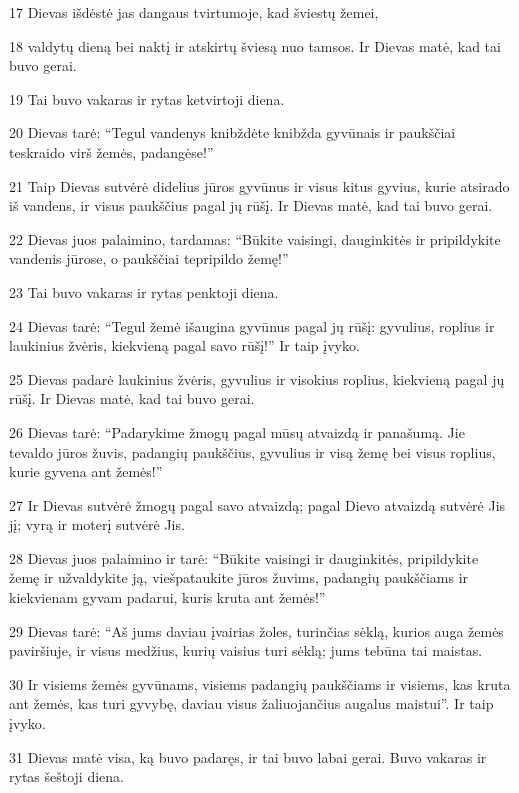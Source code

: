 \par 17 Dievas išdėstė jas dangaus tvirtumoje, kad šviestų žemei, 
\par 18 valdytų dieną bei naktį ir atskirtų šviesą nuo tamsos. Ir Dievas matė, kad tai buvo gerai. 
\par 19 Tai buvo vakaras ir rytas­ ketvirtoji diena. 
\par 20 Dievas tarė: “Tegul vandenys knibždėte knibžda gyvūnais ir paukščiai teskraido virš žemės, padangėse!” 
\par 21 Taip Dievas sutvėrė didelius jūros gyvūnus ir visus kitus gyvius, kurie atsirado iš vandens, ir visus paukščius pagal jų rūšį. Ir Dievas matė, kad tai buvo gerai. 
\par 22 Dievas juos palaimino, tardamas: “Būkite vaisingi, dauginkitės ir pripildykite vandenis jūrose, o paukščiai tepripildo žemę!” 
\par 23 Tai buvo vakaras ir rytas­ penktoji diena. 
\par 24 Dievas tarė: “Tegul žemė išaugina gyvūnus pagal jų rūšį: gyvulius, roplius ir laukinius žvėris, kiekvieną pagal savo rūšį!” Ir taip įvyko. 
\par 25 Dievas padarė laukinius žvėris, gyvulius ir visokius roplius, kiekvieną pagal jų rūšį. Ir Dievas matė, kad tai buvo gerai. 
\par 26 Dievas tarė: “Padarykime žmogų pagal mūsų atvaizdą ir panašumą. Jie tevaldo jūros žuvis, padangių paukščius, gyvulius ir visą žemę bei visus roplius, kurie gyvena ant žemės!” 
\par 27 Ir Dievas sutvėrė žmogų pagal savo atvaizdą; pagal Dievo atvaizdą sutvėrė Jis jį; vyrą ir moterį sutvėrė Jis. 
\par 28 Dievas juos palaimino ir tarė: “Būkite vaisingi ir dauginkitės, pripildykite žemę ir užvaldykite ją, viešpataukite jūros žuvims, padangių paukščiams ir kiekvienam gyvam padarui, kuris kruta ant žemės!” 
\par 29 Dievas tarė: “Aš jums daviau įvairias žoles, turinčias sėklą, kurios auga žemės paviršiuje, ir visus medžius, kurių vaisius turi sėklą; jums tebūna tai maistas. 
\par 30 Ir visiems žemės gyvūnams, visiems padangių paukščiams ir visiems, kas kruta ant žemės, kas turi gyvybę, daviau visus žaliuojančius augalus maistui”. Ir taip įvyko. 
\par 31 Dievas matė visa, ką buvo padaręs, ir tai buvo labai gerai. Buvo vakaras ir rytas­ šeštoji diena.





